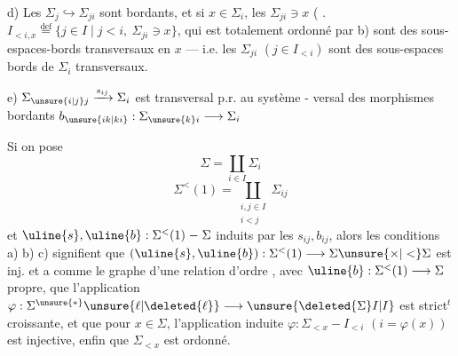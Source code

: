 d)  Les $\Sigma_j\hookrightarrow\Sigma_{ji}$ sont bordants, et si
$x\in\Sigma_i$,   les $\Sigma_{ji}\ni x$ (
\deleted{$\Sigma$}. $I_{<i,x}\overset{\mathrm{def}}{=}\{j\in I\mid j<i,\ \Sigma_{ji}\ni x\}$,
qui est totalement ordonné par b) sont
des sous-espaces-bords transversaux en $x$
--- i.e. les $\Sigma_{ji}$ $(j\in I_{<i})$ sont des
sous-espaces bords de $\Sigma_i$ 
transversaux.

e) $\Sigma_{\unsure{i|j}j}\xrightarrow{s_{ij}}\Sigma_i$ est transversal p.r. au système -
versal des morphismes bordants
$b_{\unsure{ik|ki}}:\Sigma_{\unsure{k}i}\longrightarrow\Sigma_i$

Si on pose
\[
\Sigma=\coprod_{i\in I}\Sigma_i
\]
\[
\Sigma^{<}(1)=\coprod_{\substack{i,j\in I\\i<j}}\Sigma_{ij}
\]
et $\uline{s},\uline{b}:\Sigma^{<}(1)\mathrel{-}\Sigma$ induits par les
$s_{ij},b_{ij}$, alors les conditions a) b) c)
signifient que $(\uline{s},\uline{b}):\Sigma^{<}(1)\longrightarrow\Sigma\unsure{\times|<}\Sigma$ est
inj. et a comme  le graphe d'une
relation d'ordre , avec $\uline{b}:\Sigma^{<}(1)\longrightarrow\Sigma$
 propre,  que l'application  $\varphi:\Sigma^{\unsure{*}}\unsure{\ell|\deleted{\ell}}\longrightarrow\unsure{\deleted{\Sigma}I|I}$
est strict\({}^t\) croissante, et que pour  $x\in\Sigma$,
l'application induite $\varphi:\Sigma_{<x}\mathrel{-}I_{<i}$ $(i=\varphi(x))$ est
injective, enfin que $\Sigma_{<x}$ est  ordonné.
